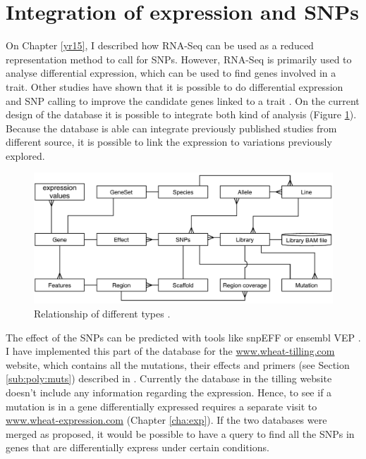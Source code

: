 \section{Integration of expression and SNPs}

On Chapter \ref{yr15}, I described how RNA-Seq can be used as a reduced representation method to call for SNPs. 
However, RNA-Seq is primarily used to analyse differential expression, which can be used to find genes involved in a trait.
Other studies have shown that it is possible to do differential expression and SNP calling to improve the candidate genes linked to a trait \citep{Lopez-Maestre2016}.
On the current design of the database it is possible to integrate both kind of analysis (Figure \ref{fig:discussion:sequencingExperimentsTables}). 
Because the database is able can integrate previously published studies from different source, it is possible to link the expression to variations previously explored. 

\begin{figure}
\includegraphics[width=1\textwidth]{Conclusions/Figures/IntegratingExperiments.pdf}
\caption{Relationship of different types .}
\label{fig:discussion:sequencingExperimentsTables}
\end{figure}

The effect of the SNPs can be predicted with tools like snpEFF \citep{Cingolani2012} or ensembl VEP \citep{Mclaren2016}. 
I have implemented this part of the database for the \url{www.wheat-tilling.com} website, which contains all the mutations, their effects and primers (see Section \ref{sub:poly:muts}) described in \citet{Krasileva2016}. 
Currently the database in the tilling website doesn't include any information regarding the expression. 
Hence, to see if a mutation is in a gene differentially expressed requires a separate visit to \url{www.wheat-expression.com} (Chapter \ref{cha:exp}). 
If the two databases were merged as proposed, it would be possible to have a query to find all the SNPs in genes that are differentially express under certain conditions. 

